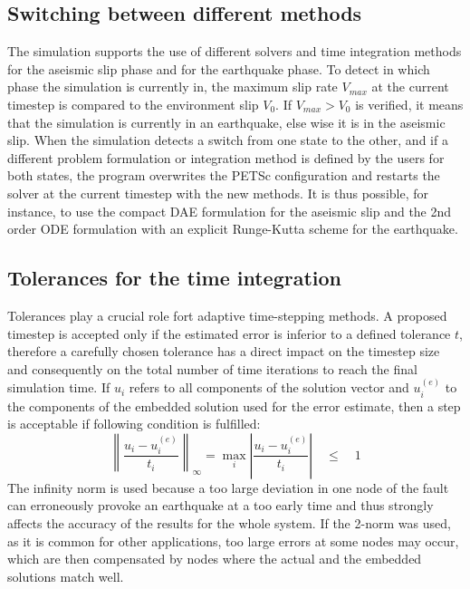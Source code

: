 \subsection{Switching between different methods}
The simulation supports the use of different solvers and time integration methods for the aseismic slip phase and for the earthquake phase. To detect in which phase the simulation is currently in, the maximum slip rate $V_{max}$ at the current timestep is compared to the environment slip $V_0$. If $V_{max}>V_0$ is verified, it means that the simulation is currently in an earthquake, else wise it is in the aseismic slip. When the simulation detects a switch from one state to the other, and if a different problem formulation or integration method is defined by the users for both states, the program overwrites the PETSc configuration and restarts the solver at the current timestep with the new methods. It is thus possible, for instance, to use the compact DAE formulation for the aseismic slip and the 2nd order ODE formulation with an explicit Runge-Kutta scheme for the earthquake. 

\subsection{Tolerances for the time integration}
Tolerances play a crucial role fort adaptive time-stepping methods. A proposed timestep is accepted only if the estimated error is inferior to a defined tolerance $t$, therefore a carefully chosen tolerance has a direct impact on the timestep size and consequently on the total number of time iterations to reach the final simulation time. If $u_i$ refers to all components of the solution vector and $u_i^{(e)}$ to the components of the embedded solution used for the error estimate, then a step is acceptable if following condition is fulfilled: 
\begin{equation}
\left\|\frac{u_i - u_i^{(e)}}{t_i}\right\|_\infty = \max_i \left|\frac{u_i - u_i^{(e)}}{t_i}\right|
\quad \leq \quad 1
\end{equation}
The infinity norm is used because a too large deviation in one node of the fault can erroneously provoke an earthquake at a too early time and thus strongly affects the accuracy of the results for the whole system. If the 2-norm was used, as it is common for other applications, too large errors at some nodes may occur, which are then compensated by nodes where the actual and the embedded solutions match well. \\

